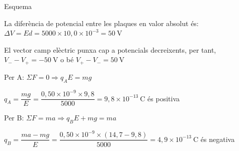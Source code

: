 \begin{solapartat}
Esquema 

 La diferència de potencial entre les plaques en valor absolut és: $\Delta V = Ed = 5000\times 10,0\times 10^{-3} = 50\ \mathrm{V}$

 El vector camp elèctric punxa cap a potencials decreixents, per tant, $V_- - V_+ = -50\ \mathrm{V}$ o bé $V_+ - V_- = 50\ \mathrm{V}$
\end{solapartat}

\begin{solapartat}

 Per A: $\Sigma F = 0 \Rightarrow q_A E = mg$

 $q_A = \dfrac{mg}{E} = \dfrac{0,50\times 10^{-9}\times 9,8}{5000} = 9,8\times 10^{-13}\ \mathrm{C}$ és positiva

 Per B: $\Sigma F = ma \Rightarrow q_B E + mg = ma$

 $q_B = \dfrac{ma - mg}{E} = \dfrac{0,50\times 10^{-9}\times (14,7 - 9,8)}{5000} = 4,9\times 10^{-13}\ \mathrm{C}$ és negativa
\end{solapartat}
